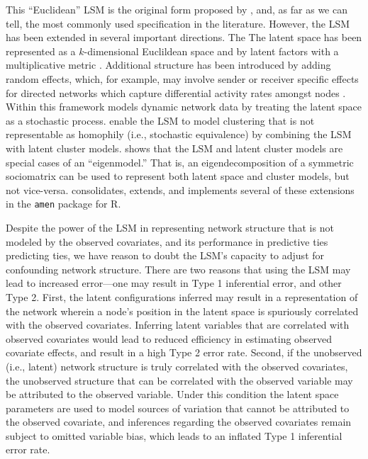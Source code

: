 \documentclass[11pt]{article}
\newcommand{\R}{\textsf{R}\space} %
\begin{document}
This ``Euclidean'' LSM is the original form proposed by \citet{hoff2002latent}, and, as far as we can tell, the most commonly used specification in the literature. However, the LSM has been extended in several important directions. The  The latent space has been represented as a $k$-dimensional Euclildean space and by latent factors with a multiplicative metric \citep{hoff2002latent, hoff2004modeling, hoff_2005_jasa, hoff2009multiplicative}. Additional structure has been introduced by adding random effects, which, for example, may involve sender or receiver specific effects for directed networks which capture differential activity rates amongst nodes \citep{hoff2003random}. Within this framework \cite{westveld2011mixed} models dynamic network data by treating the latent space as a stochastic process. \cite{handcock2007model} enable the LSM to model clustering that is not representable as homophily (i.e., stochastic equivalence) by combining the LSM with latent cluster models. \cite{hoff2008modeling} shows that the LSM and latent cluster models are special cases of an ``eigenmodel.'' That is, an eigendecomposition of a symmetric sociomatrix can be used to represent both latent space and cluster models, but not vice-versa. \citet{hoff2015dyadic} consolidates, extends, and implements several of these extensions in the \texttt{amen} package \citep{amen} for \R \citep{minhas2016inferential, hoff2015dyadic}.

Despite the power of the LSM in representing network structure that is not modeled by the observed covariates, and its performance in predictive ties predicting ties, we have reason to doubt the LSM's capacity to adjust for confounding network structure. There are two reasons that using the LSM may lead to increased error---one may result in Type 1 inferential error, and other Type 2. First, the latent configurations inferred may result in a representation of the network wherein a node's position in the latent space is spuriously correlated with the observed covariates. Inferring latent variables that are correlated with observed covariates would lead to reduced efficiency in estimating observed covariate effects, and result in a high Type 2 error rate.  Second, if the unobserved (i.e., latent) network structure is truly correlated with the observed covariates, the unobserved structure that can be correlated with the observed variable may be attributed to the observed variable. Under this condition the latent space parameters are used to model sources of variation that cannot be attributed to the observed covariate, and inferences regarding the observed covariates remain subject to omitted variable bias, which leads to an inflated Type 1 inferential error rate. 
\end{document}
